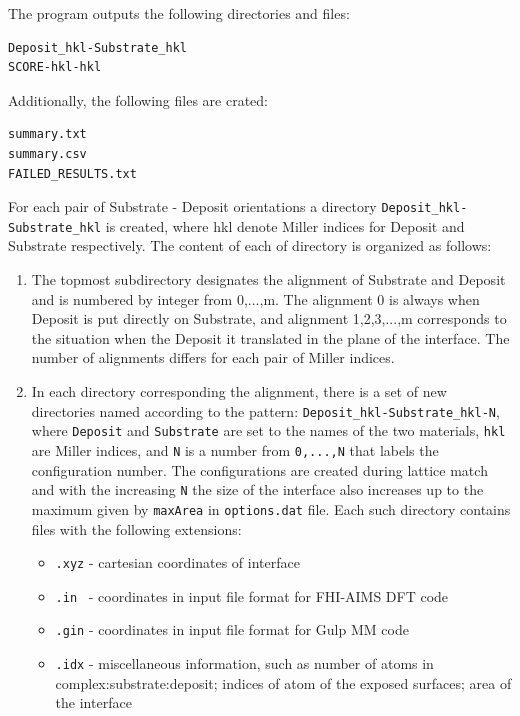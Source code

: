 \documentclass[a4paper,12pt,oneside]{article}
\begin{document}
The program outputs the following directories and files:
\begin{verbatim}
Deposit_hkl-Substrate_hkl
SCORE-hkl-hkl
\end{verbatim}
Additionally, the following files are crated:
\begin{verbatim}
summary.txt
summary.csv
FAILED_RESULTS.txt
\end{verbatim}

For each pair of Substrate - Deposit orientations a directory
\texttt{Deposit\_hkl-Substrate\_hkl} is created, where hkl denote Miller indices
for Deposit and Substrate respectively. The content of each of directory is
organized as follows: 

\begin{enumerate} 
\item The topmost subdirectory designates the alignment of Substrate and
Deposit and is numbered by integer from 0,...,m. The alignment 0 is always when
Deposit is put directly on Substrate, and alignment 1,2,3,...,m corresponds to the
situation when the Deposit it translated in the plane of the interface. The
number of alignments differs for each pair of Miller indices. 

\item In each directory corresponding the alignment, there is a set of new
directories named according to the pattern:
\texttt{Deposit\_hkl-Substrate\_hkl-N}, where \texttt{Deposit} and
\texttt{Substrate} are set to the names of the two materials, \texttt{hkl} are
Miller indices, and \texttt{N} is a number from \texttt{0,...,N} that labels the
configuration number. The configurations are created during lattice match and
with the increasing \texttt{N} the size of the interface also increases up
to the maximum given by \texttt{maxArea} in \texttt{options.dat} file.
Each such directory contains files with the following extensions:
\begin{itemize}
\item{\texttt{.xyz} - cartesian coordinates of interface}
\item{\texttt{.in}~  - coordinates in input file format for FHI-AIMS DFT code }
\item{\texttt{.gin}  - coordinates in input file format for Gulp MM code }
\item{\texttt{.idx} - miscellaneous information, such as number of atoms in
complex:substrate:deposit; indices of atom of the exposed surfaces; area of the
interface}
\end{itemize}
\end{enumerate}
\end{document}
